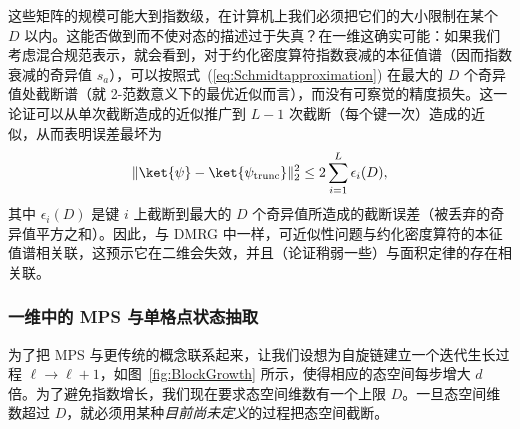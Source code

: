 这些矩阵的规模可能大到指数级，在计算机上我们必须把它们的大小限制在某个 $D$ 以内。这能否做到而不使对态的描述过于失真？在一维这确实可能：如果我们考虑混合规范表示，就会看到，对于约化密度算符指数衰减的本征值谱（因而指数衰减的奇异值 $s_a$），可以按照式~(\ref{eq:Schmidtapproximation}) 在最大的 $D$ 个奇异值处截断谱（就 2-范数意义下的最优近似而言），而没有可察觉的精度损失。这一论证可以从单次截断造成的近似推广到 $L-1$ 次截断（每个键一次）造成的近似，从而表明误差最坏为 \cite{Verstraete06}
\begin{equation}
\| \ket{\psi} - \ket{\psi_{{\rm trunc}}} \|_2^2 \leq 2 \sum_{i=1}^L \epsilon_i(D) ,
\end{equation}
其中 $\epsilon_i(D)$ 是键 $i$ 上截断到最大的 $D$ 个奇异值所造成的截断误差（被丢弃的奇异值平方之和）。因此，与 DMRG 中一样，可近似性问题与约化密度算符的本征值谱相关联，这预示它在二维会失效，并且（论证稍弱一些）与面积定律的存在相关联。

\subsubsection{一维中的 MPS 与单格点状态抽取}
\label{subsubsec:MPSsinglesitedecimation}

为了把 MPS 与更传统的概念联系起来，让我们设想为自旋链建立一个迭代生长过程 $\ell \rightarrow \ell + 1$，如图~\ref{fig:BlockGrowth} 所示，使得相应的态空间每步增大 $d$ 倍。为了避免指数增长，我们现在要求态空间维数有一个上限 $D$。一旦态空间维数超过 $D$，就必须用某种{\em 目前尚未定义}的过程把态空间截断。

